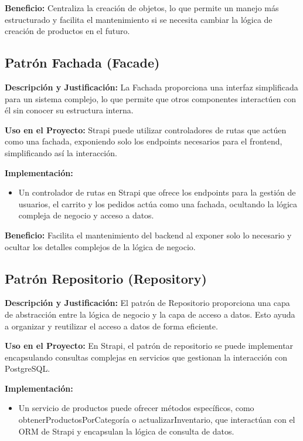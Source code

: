 \documentclass[12pt]{article}
\begin{document}
\textbf{Beneficio:} Centraliza la creación de objetos, lo que permite un manejo más estructurado y facilita el mantenimiento si se necesita cambiar la lógica de creación de productos en el futuro.

\subsection{Patrón Fachada (Facade)}
\textbf{Descripción y Justificación:} La Fachada proporciona una interfaz simplificada para un sistema complejo, lo que permite que otros componentes interactúen con él sin conocer su estructura interna.

\textbf{Uso en el Proyecto:} Strapi puede utilizar controladores de rutas que actúen como una fachada, exponiendo solo los endpoints necesarios para el frontend, simplificando así la interacción.

\textbf{Implementación:}
\begin{itemize}
    \item Un controlador de rutas en Strapi que ofrece los endpoints para la gestión de usuarios, el carrito y los pedidos actúa como una fachada, ocultando la lógica compleja de negocio y acceso a datos.
\end{itemize}

\textbf{Beneficio:} Facilita el mantenimiento del backend al exponer solo lo necesario y ocultar los detalles complejos de la lógica de negocio.

\subsection{Patrón Repositorio (Repository)}
\textbf{Descripción y Justificación:} El patrón de Repositorio proporciona una capa de abstracción entre la lógica de negocio y la capa de acceso a datos. Esto ayuda a organizar y reutilizar el acceso a datos de forma eficiente.

\textbf{Uso en el Proyecto:} En Strapi, el patrón de repositorio se puede implementar encapsulando consultas complejas en servicios que gestionan la interacción con PostgreSQL.

\textbf{Implementación:}
\begin{itemize}
    \item Un servicio de productos puede ofrecer métodos específicos, como obtenerProductosPorCategoría o actualizarInventario, que interactúan con el ORM de Strapi y encapsulan la lógica de consulta de datos.
\end{itemize}
\end{document}
